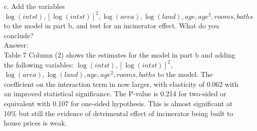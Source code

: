 \documentclass[10pt]{article}
\begin{document}
\begin{enumerate}
\item[c.] Add the variables $\log(intst),[\log(intst)]^2,\log(area),\log(land),age,age^2,rooms,baths$ to the model in part b, and test for an incinerator effect. What do you conclude?
\\ Answer:\\
Table 7 Column (2) shows the estimates for the model in part b and adding the following variables: $\log(intst),[\log(intst)]^2,$ $\log(area),\log(land),age,age^2,rooms,baths$ to the model. The coefficient on the interaction term in now larger, with elasticity of 0.062 with an improved statistical significance. The P-value is 0.214 for two-sided or equivalent with 0.107 for one-sided hypothesis. This is almost significant at 10\% but still the evidence of detrimental effect of incinerator being built to house prices is weak.

\end{enumerate}
\end{document}
